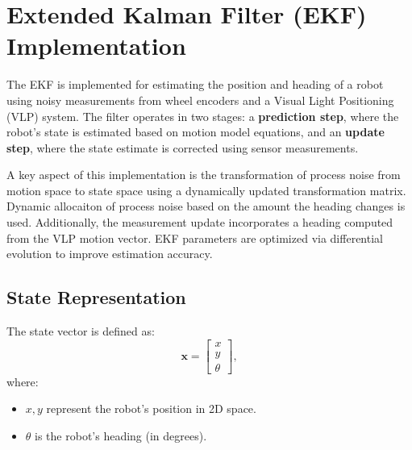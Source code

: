 


\section*{Extended Kalman Filter (EKF) Implementation}

The EKF is implemented for estimating the position and heading of a robot using noisy measurements from wheel encoders and a Visual Light Positioning (VLP) system. The filter operates in two stages: a \textbf{prediction step}, where the robot's state is estimated based on motion model equations, and an \textbf{update step}, where the state estimate is corrected using sensor measurements.

A key aspect of this implementation is the transformation of process noise from motion space to state space using a dynamically updated transformation matrix. Dynamic allocaiton of process noise based on the amount the heading changes is used. 
Additionally, the measurement update incorporates a heading computed from the VLP motion vector. 
EKF parameters are optimized via differential evolution to improve estimation accuracy.

\subsection*{State Representation}
The state vector is defined as:
\[
\bm{x} = 
\begin{bmatrix}
x \\
y \\
\theta
\end{bmatrix},
\]
where:
\begin{itemize}
    \item \(x, y\) represent the robot's position in 2D space.
    \item \(\theta\) is the robot's heading (in degrees).
\end{itemize}

